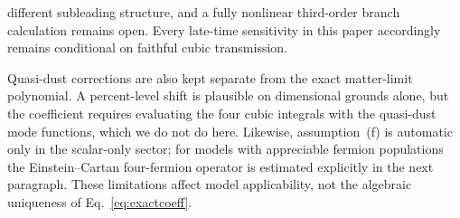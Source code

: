 \documentclass[aps,prd,twocolumn,superscriptaddress,showpacs,preprintnumbers,nofootinbib,longbibliography,floatfix]{revtex4-2}
\begin{document}
different subleading structure, and a fully nonlinear third-order branch calculation remains open. Every late-time sensitivity in this paper accordingly remains conditional on faithful cubic transmission.

Quasi-dust corrections are also kept separate from the exact matter-limit polynomial. A percent-level shift is plausible on dimensional grounds alone, but the coefficient requires evaluating the four cubic integrals with the quasi-dust mode functions, which we do not do here. Likewise, assumption~(f) is automatic only in the scalar-only sector; for models with appreciable fermion populations the Einstein--Cartan four-fermion operator is estimated explicitly in the next paragraph. These limitations affect model applicability, not the algebraic uniqueness of Eq.~\eqref{eq:exactcoeff}.
\end{document}
